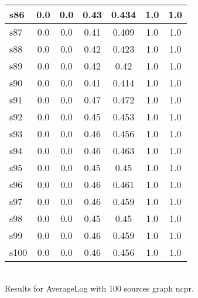 \documentclass{article}
\begin{document}
\begin{tabular}{|l|c|c|c|c|c|c|}
\hline
s86 &0.0 & 0.0 & 0.43 & 0.434 & 1.0 & 1.0\\
\hline
s87 &0.0 & 0.0 & 0.41 & 0.409 & 1.0 & 1.0\\
\hline
s88 &0.0 & 0.0 & 0.42 & 0.423 & 1.0 & 1.0\\
\hline
s89 &0.0 & 0.0 & 0.42 & 0.42 & 1.0 & 1.0\\
\hline
s90 &0.0 & 0.0 & 0.41 & 0.414 & 1.0 & 1.0\\
\hline
s91 &0.0 & 0.0 & 0.47 & 0.472 & 1.0 & 1.0\\
\hline
s92 &0.0 & 0.0 & 0.45 & 0.453 & 1.0 & 1.0\\
\hline
s93 &0.0 & 0.0 & 0.46 & 0.456 & 1.0 & 1.0\\
\hline
s94 &0.0 & 0.0 & 0.46 & 0.463 & 1.0 & 1.0\\
\hline
s95 &0.0 & 0.0 & 0.45 & 0.45 & 1.0 & 1.0\\
\hline
s96 &0.0 & 0.0 & 0.46 & 0.461 & 1.0 & 1.0\\
\hline
s97 &0.0 & 0.0 & 0.46 & 0.459 & 1.0 & 1.0\\
\hline
s98 &0.0 & 0.0 & 0.45 & 0.45 & 1.0 & 1.0\\
\hline
s99 &0.0 & 0.0 & 0.46 & 0.459 & 1.0 & 1.0\\
\hline
s100 &0.0 & 0.0 & 0.46 & 0.456 & 1.0 & 1.0\\
\hline
\end{tabular}\\

\noindent Results for AverageLog with 100 sources graph ncpr.
\end{document}
